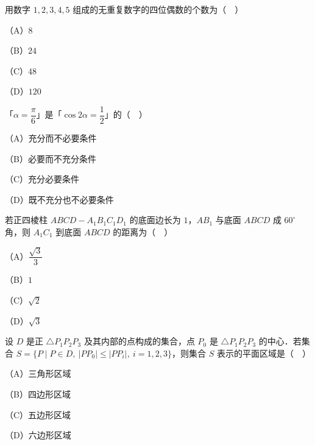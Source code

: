 \begin{question}
用数字 $1,2,3,4,5$ 组成的无重复数字的四位偶数的个数为（　）

（A）$8$

（B）$24$

（C）$48$

（D）$120$

\end{question}
\begin{question}
「$\alpha=\dfrac{\pi}{6}$」是「$\cos2\alpha=\dfrac12$」的（　）

（A）充分而不必要条件

（B）必要而不充分条件

（C）充分必要条件

（D）既不充分也不必要条件

\end{question}
\begin{question}
若正四棱柱 $ABCD-A_1B_1C_1D_1$ 的底面边长为 $1$，$AB_1$ 与底面 $ABCD$ 成 $60^\circ$ 角，则 $A_1C_1$ 到底面 $ABCD$ 的距离为（　）

（A）$\dfrac{\sqrt3}{3}$

（B）$1$

（C）$\sqrt2$

（D）$\sqrt3$

\end{question}
\begin{question}
设 $D$ 是正 $\triangle P_1P_2P_3$ 及其内部的点构成的集合，点 $P_0$ 是 $\triangle P_1P_2P_3$ 的中心．若集合 $S=\{P\mid P\in D,\ |PP_0|\leqslant|PP_i|,\ i=1,2,3\}$，则集合 $S$ 表示的平面区域是（　）

（A）三角形区域

（B）四边形区域

（C）五边形区域

（D）六边形区域

\end{question}


